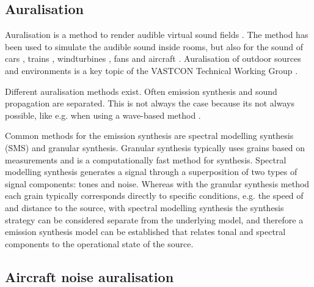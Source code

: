 \subsection{Auralisation}\label{sec:introduction:background:auralisation}%

Auralisation is a method to render audible virtual sound fields \cite{Kleiner1993}.
The method has been used to simulate the audible sound inside
rooms, but also for the sound of
cars \cite{Forssen2009,Maillard2012,Pieren2015,Hoffmann2016,Hoffmann2016a},
trains \cite{Pieren2016},
windturbines \cite{Pieren2014,Heutschi2014},
fans \cite{Merino2016} and
aircraft \cite{Arntzen2014a, Rizzi2016a, Rizzi2016}. Auralisation of outdoor sources
and environments is a key topic of the VASTCON Technical Working Group \cite{Vastcon}.


Different auralisation methods exist. Often emission synthesis and sound
propagation are separated. This is not always the case because its not always
possible, like e.g. when using a wave-based method
\cite{Hornikx2016,Georgiou2016,Georgiou2016a}.

Common methods for the emission synthesis are spectral modelling synthesis (SMS)
and granular synthesis. Granular synthesis typically uses grains based on
measurements and is a computationally fast method for synthesis. Spectral
modelling synthesis generates a signal through a superposition of two types of
signal components: tones and noise. Whereas with the granular synthesis method
each grain typically corresponds directly to specific conditions, e.g. the speed
of and distance to the source, with spectral modelling synthesis the synthesis
strategy can be considered separate from the underlying model, and therefore a
emission synthesis model can be established that relates tonal and spectral
components to the operational state of the source.


\subsection{Aircraft noise auralisation} 

